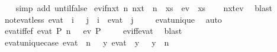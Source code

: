 \begin{isabellebody}
%
\isadelimproof
\ \ %
\endisadelimproof
%
\isatagproof
{}\isamarkupfalse%
\ {\isacharparenleft}simp\ add{\isacharcolon}\ until{\isacharunderscore}false{\isacharparenright}%
\endisatagproof
{\isafoldproof}%
%
\isadelimproof
\isanewline
%
\endisadelimproof
\isanewline
{}\isamarkupfalse%
\ ev{\isacharunderscore}if{\isacharunderscore}nxt{\isacharcolon}\ {\isachardoublequoteopen}{\isasymexists}n{\isachardot}\ {\isacharparenleft}nxt\ {\isacharcircum}{\isacharcircum}\ n{\isacharparenright}\ {\isasymphi}\ xs\ {\isasymLongrightarrow}\ ev\ {\isasymphi}\ xs{\isachardoublequoteclose}\isanewline
%
\isadelimproof
\ \ %
\endisadelimproof
%
\isatagproof
{}\isamarkupfalse%
\ nxt{\isacharunderscore}ev\ \isamarkupfalse%
\ blast%
\endisatagproof
{\isafoldproof}%
%
\isadelimproof
\isanewline
%
\endisadelimproof
\isanewline
{}\isamarkupfalse%
\ not{\isacharunderscore}ev{\isacharunderscore}at{\isacharunderscore}less{\isacharcolon}\ {\isachardoublequoteopen}ev{\isacharunderscore}at\ {\isasymphi}\ i\ {\isasymomega}\ {\isasymLongrightarrow}\ {\isasymforall}j\ {\isacharless}\ i{\isachardot}\ {\isasymnot}\ ev{\isacharunderscore}at\ {\isasymphi}\ j\ {\isasymomega}{\isachardoublequoteclose}\isanewline
%
\isadelimproof
\ \ %
\endisadelimproof
%
\isatagproof
{}\isamarkupfalse%
\ ev{\isacharunderscore}at{\isacharunderscore}unique\ \isamarkupfalse%
\ auto%
\endisatagproof
{\isafoldproof}%
%
\isadelimproof
\isanewline
%
\endisadelimproof
\isanewline
{}\isamarkupfalse%
\ ev{\isacharunderscore}at{\isacharunderscore}iff{\isacharunderscore}ef{\isacharcolon}\ {\isachardoublequoteopen}ev{\isacharunderscore}at\ P\ n\ {\isasymomega}\ {\isasymLongrightarrow}\ ev\ P\ {\isasymomega}{\isachardoublequoteclose}\isanewline
%
\isadelimproof
\ \ %
\endisadelimproof
%
\isatagproof
{}\isamarkupfalse%
\ ev{\isacharunderscore}iff{\isacharunderscore}ev{\isacharunderscore}at\ \isamarkupfalse%
\ blast%
\endisatagproof
{\isafoldproof}%
%
\isadelimproof
\isanewline
%
\endisadelimproof
\isanewline
{}\isamarkupfalse%
\ ev{\isacharunderscore}at{\isacharunderscore}unique{\isacharunderscore}case{\isacharcolon}\ {\isachardoublequoteopen}ev{\isacharunderscore}at\ {\isasymphi}\ n\ {\isasymomega}\ {\isasymLongrightarrow}\ {\isasymforall}y{\isachardot}\ ev{\isacharunderscore}at\ {\isasymphi}\ y\ {\isasymomega}\ {\isasymlongrightarrow}\ y\ {\isacharequal}\ n{\isachardoublequoteclose}\isanewline
%
\isadelimproof
\ \ %
\endisadelimproof
%
\isatagproof
{}\isamarkupfalse%

\end{isabellebody}
